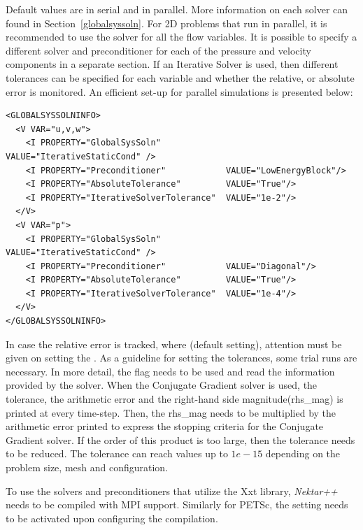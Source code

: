 \begin{itemize}
Default values are  in serial and  in parallel. More information on each solver can found in Section~\ref{globalsyssoln}. For 2D problems that run in parallel, it is recommended to use the  solver for all the flow variables. It is possible to specify a different solver and  preconditioner for each of the pressure and velocity components in a separate  section. If an Iterative Solver is used, then different tolerances can be specified for each variable and whether the relative, or absolute error is monitored. An efficient set-up for parallel simulations is presented below:  
%
\begin{lstlisting}[style=XMLStyle]
<GLOBALSYSSOLNINFO>
  <V VAR="u,v,w">
    <I PROPERTY="GlobalSysSoln"             VALUE="IterativeStaticCond" />
    <I PROPERTY="Preconditioner"            VALUE="LowEnergyBlock"/>
    <I PROPERTY="AbsoluteTolerance"         VALUE="True"/>
    <I PROPERTY="IterativeSolverTolerance"  VALUE="1e-2"/>
  </V>
  <V VAR="p">
    <I PROPERTY="GlobalSysSoln"             VALUE="IterativeStaticCond" />
    <I PROPERTY="Preconditioner"            VALUE="Diagonal"/>
    <I PROPERTY="AbsoluteTolerance"         VALUE="True"/>
    <I PROPERTY="IterativeSolverTolerance"  VALUE="1e-4"/>
  </V>
</GLOBALSYSSOLNINFO>
\end{lstlisting}

In case the relative error is tracked, where (default setting), attention must be given on setting the . As a guideline for setting the tolerances, some trial runs are necessary. In more detail, the flag  needs to be used and read the information provided by the solver. When the Conjugate Gradient solver is used, the tolerance, the arithmetic error and the right-hand side magnitude(rhs\_mag) is printed at every time-step. Then, the rhs\_mag needs to be multiplied by the arithmetic error printed to express the stopping criteria for the Conjugate Gradient solver. If the order of this product is too large, then the tolerance needs to be reduced. The tolerance can reach values up to $1e-15$ depending on the problem size, mesh and configuration.

\begin{notebox}
To use the solvers and preconditioners that utilize the Xxt library, \emph{Nektar++} needs to be compiled with MPI support. Similarly for PETSc, the setting  needs to be activated upon configuring the compilation.
\end{notebox}

\end{itemize}



